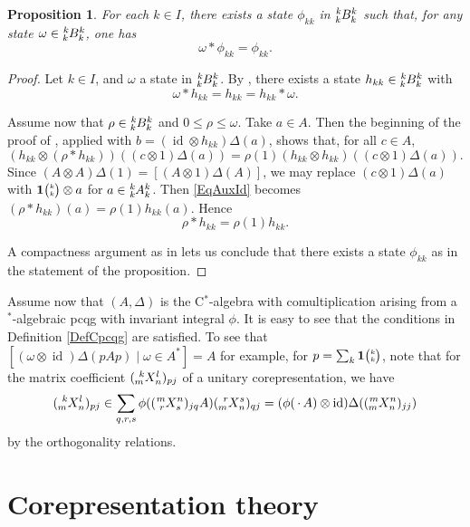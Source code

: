 \documentclass[11pt]{article}
\DeclareMathOperator{\id}{id}
\newcommand{\Grt}[3]{#1{\tiny {\begin{pmatrix} #2\\#3\end{pmatrix}}}}
\newcommand{\UnitC}[2]{\Grt{\mathbf{1}}{#1}{#2}}
\newcommand{\Gr}[5]{\tensor*[^{#2}_{#4}]{#1}{^{#3}_{#5}}}%
\newtheorem{Prop}[Theorem]{Proposition}
\theoremstyle{definition}
\numberwithin{equation}{section}
\begin{document}
\begin{Prop} For each $k\in I$, there exists a state $\phi_{kk}$ in $\Gr{B}{k}{k}{k}{k}$ such that, for any state $\omega \in \Gr{B}{k}{k}{k}{k}$, one has \[\omega*\phi_{kk} =\phi_{kk}.\]
\end{Prop} 
\begin{proof} Let $k\in I$, and $\omega$ a state in $\Gr{B}{k}{k}{k}{k}$. By \cite[Lemma 4.2]{MVD1},
  there exists a state $h_{kk} \in \Gr{B}{k}{k}{k}{k}$ with \[\omega *h_{kk}= h_{kk} =
  h_{kk}*\omega.\]

  Assume now that $\rho\in \Gr{B}{k}{k}{k}{k}$ and $0\leq \rho\leq \omega$. Take $a\in A$. Then the
  beginning of the proof of \cite[Lemma 4.3]{MVD1}, applied with $b= (\id\otimes h_{kk})\Delta(a)$,
  shows that, for all $c\in A$, 
  \begin{equation}\label{EqAuxId} (h_{kk}\otimes
    (\rho*h_{kk}))((c\otimes 1)\Delta(a)) = \rho(1) (h_{kk}\otimes h_{kk})((c\otimes
    1)\Delta(a)).\end{equation} 
Since $(A\otimes A)\Delta(1) = [(A\otimes 1)\Delta(A)]$, we may
  replace $(c\otimes 1)\Delta(a)$ with $\UnitC{k}{k}\otimes a$ for $a\in \Gr{A}{k}{k}{k}{k}$. Then
  \eqref{EqAuxId} becomes $(\rho*h_{kk})(a) = \rho(1)h_{kk}(a)$. Hence \[\rho*h_{kk} =
  \rho(1)h_{kk}.\]

A compactness argument as in \cite[Theorem 4.4]{MVD1} lets us conclude that there exists a state $\phi_{kk}$ as in the statement of the proposition.
\end{proof}


  Assume now that $(A,\Delta)$ is the C$^*$-algebra with comultiplication arising from a $^*$-algebraic pcqg with invariant integral $\phi$. It is easy to see that the conditions in Definition \ref{DefCpcqg} are satisfied. To see that $[(\omega\otimes \id)\Delta(pAp)\mid \omega \in A^*] = A$ for example, for $p = \sum_{k} \UnitC{k}{k}$, note that for the matrix coefficient $(\Gr{X}{k}{l}{m}{n})_{pj}$ of a unitary corepresentation, we have \[ (\Gr{X}{k}{l}{m}{n})_{pj} \in \sum_{q,r,s} \phi((\Gr{X}{m}{n}{r}{s})_{jq}A) (\Gr{X}{r}{s}{m}{n})_{qj} =(\phi(\,\cdot\, A)\otimes \id)\Delta((\Gr{X}{m}{n}{m}{n})_{jj})\] by the orthogonality relations. 




\section{Corepresentation theory}
\end{document}
